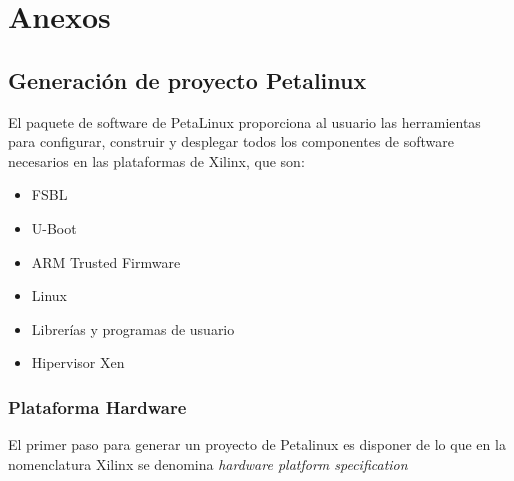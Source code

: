 \chapter{Anexos}

\section{Generación de proyecto Petalinux} \label{petalinux}

El paquete de software de PetaLinux proporciona al usuario las herramientas para configurar, construir y desplegar todos los componentes de software necesarios en las plataformas de Xilinx, que son:
\begin{itemize}
  \item \acrshort{FSBL}
  \item U-Boot
  \item ARM Trusted Firmware
  \item Linux
  \item Librerías y programas de usuario
  \item Hipervisor Xen
\end{itemize}


\subsection{Plataforma Hardware}
El primer paso para generar un proyecto de Petalinux es disponer de lo que en la nomenclatura Xilinx se denomina \textit{hardware platform specification}
